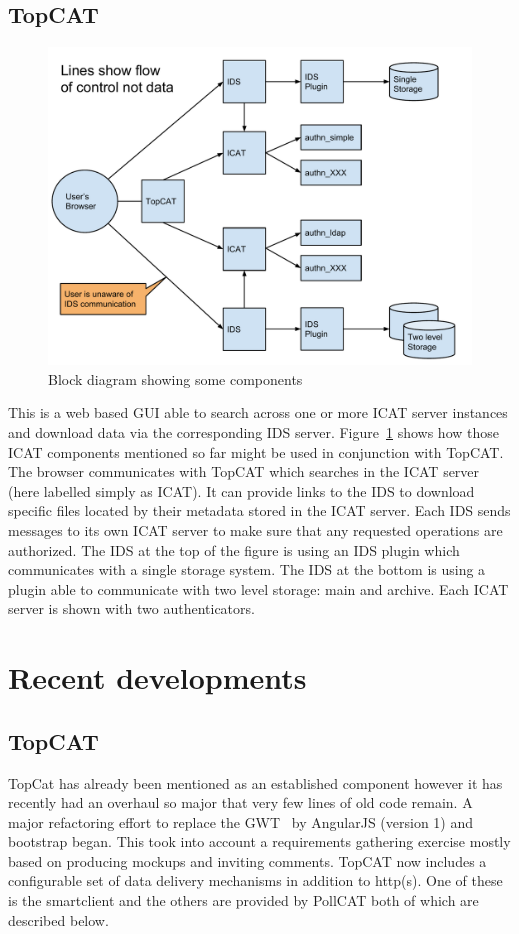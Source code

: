 \documentclass[a4paper]{jpconf}
\begin{document}
\subsection{TopCAT}
\begin{figure}[htp]
\begin{center}
  \includegraphics[scale=0.45]{ICATComponents.pdf}
    \caption{Block diagram showing some components}
    \label{fig:most_components}
\end{center}
\end{figure}
This is a web based GUI able to search across one or more ICAT server
instances and download data via the corresponding IDS server.
Figure~\ref{fig:most_components} shows how those ICAT components
mentioned so far might be used in conjunction with TopCAT.
The browser communicates with TopCAT which searches
in the ICAT server (here labelled simply as ICAT). It can provide
links to the IDS to download specific files located by their
metadata stored in the ICAT server. Each IDS sends messages to its
own ICAT server to make sure that any requested operations
are authorized. The IDS at the top of the figure is using an IDS
plugin which communicates with a single storage system. The IDS at
the bottom is using a plugin able to communicate with two level
storage: main and archive. Each ICAT server is shown with two
authenticators.

\section{Recent developments}
\subsection{TopCAT}
TopCat has already been mentioned as an established component however
it has recently had an overhaul so major that very few lines of old
code remain.  A major refactoring effort to replace the
GWT~\cite{ref:gwt} by AngularJS (version 1) and bootstrap began. This took
into account a requirements gathering exercise mostly based on
producing mockups and inviting comments. TopCAT now includes a
configurable set of data delivery mechanisms in addition to
http(s). One of these is the smartclient and the others are provided
by PollCAT both of which are described below.
\end{document}
